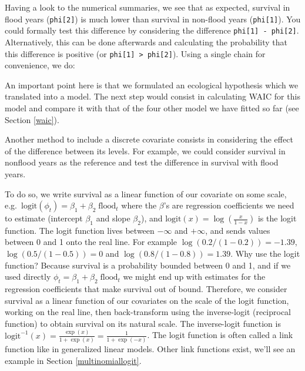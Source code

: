 \documentclass[
  12pt,
]{krantz}
\newenvironment{Shaded}{\begin{snugshade}}{\end{snugshade}}
\newcommand{\DecValTok}[1]{\textcolor[rgb]{0.00,0.00,0.81}{#1}}
\newcommand{\DocumentationTok}[1]{\textcolor[rgb]{0.56,0.35,0.01}{\textbf{\textit{#1}}}}
\newcommand{\FunctionTok}[1]{\textcolor[rgb]{0.13,0.29,0.53}{\textbf{#1}}}
\newcommand{\NormalTok}[1]{#1}
\newcommand{\OtherTok}[1]{\textcolor[rgb]{0.56,0.35,0.01}{#1}}
\newcommand{\SpecialCharTok}[1]{\textcolor[rgb]{0.81,0.36,0.00}{\textbf{#1}}}
\newcommand{\StringTok}[1]{\textcolor[rgb]{0.31,0.60,0.02}{#1}}
\begin{document}
Having a look to the numerical summaries, we see that as expected, survival in flood years (\texttt{phi{[}2{]}}) is much lower than survival in non-flood years (\texttt{phi{[}1{]}}). You could formally test this difference by considering the difference \texttt{phi{[}1{]}\ -\ phi{[}2{]}}. Alternatively, this can be done afterwards and calculating the probability that this difference is positive (or \texttt{phi{[}1{]}\ \textgreater{}\ phi{[}2{]}}). Using a single chain for convenience, we do:

\begin{Shaded}
\end{Shaded}

An important point here is that we formulated an ecological hypothesis which we translated into a model. The next step would consist in calculating WAIC for this model and compare it with that of the four other model we have fitted so far (see Section \ref{waic}).

Another method to include a discrete covariate consists in considering the effect of the difference between its levels. For example, we could consider survival in nonflood years as the reference and test the difference in survival with flood years.

To do so, we write survival as a linear function of our covariate on some scale, e.g.~\(\text{logit}(\phi_t) = \beta_1 + \beta_2 \;\text{flood}_t\) where the \(\beta\)'s are regression coefficients we need to estimate (intercept \(\beta_1\) and slope \(\beta_2\)), and \(\text{logit}(x) = \log \displaystyle{\left(\frac{x}{1-x}\right)}\) is the logit function. The logit function lives between \(-\infty\) and \(+\infty\), and sends values between 0 and 1 onto the real line. For example \(\log(0.2/(1-0.2))=-1.39\), \(\log(0.5/(1-0.5))=0\) and \(\log(0.8/(1-0.8))=1.39\). Why use the logit function? Because survival is a probability bounded between 0 and 1, and if we used directly \(\phi_t = \beta_1 + \beta_2 \;\text{flood}_t\) we might end up with estimates for the regression coefficients that make survival out of bound. Therefore, we consider survival as a linear function of our covariates on the scale of the logit function, working on the real line, then back-transform using the inverse-logit (reciprocal function) to obtain survival on its natural scale. The inverse-logit function is \(\displaystyle{\text{logit}^{-1}(x) = \frac{\exp(x)}{1+\exp(x)} = \frac{1}{1+\exp(-x)}}\). The logit function is often called a link function like in generalized linear models. Other link functions exist, we'll see an example in Section \ref{multinomiallogit}.
\end{document}
